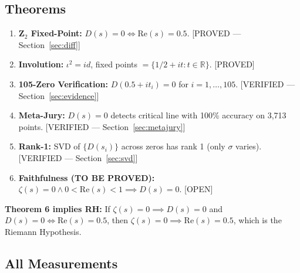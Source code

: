 \documentclass[11pt]{article}
\begin{document}
\subsection{Theorems}

\begin{enumerate}
\item \textbf{Z$_2$ Fixed-Point:} $D(s) = 0 \iff \mathrm{Re}(s) = 0.5$. [PROVED --- Section~\ref{sec:diff}]
\item \textbf{Involution:} $\iota^2 = id$, fixed points $= \{1/2 + it : t \in \mathbb{R}\}$. [PROVED]
\item \textbf{105-Zero Verification:} $D(0.5 + it_i) = 0$ for $i = 1,\ldots,105$. [VERIFIED --- Section~\ref{sec:evidence}]
\item \textbf{Meta-Jury:} $D(s) = 0$ detects critical line with 100\% accuracy on 3,713 points. [VERIFIED --- Section~\ref{sec:metajury}]
\item \textbf{Rank-1:} SVD of $\{D(s_i)\}$ across zeros has rank 1 (only $\sigma$ varies). [VERIFIED --- Section~\ref{sec:svd}]
\item \textbf{Faithfulness (TO BE PROVED):} $\zeta(s) = 0 \land 0 < \mathrm{Re}(s) < 1 \implies D(s) = 0$. [OPEN]
\end{enumerate}

\textbf{Theorem 6 implies RH:} If $\zeta(s)=0 \implies D(s)=0$ and $D(s)=0 \iff \mathrm{Re}(s)=0.5$, then $\zeta(s)=0 \implies \mathrm{Re}(s)=0.5$, which is the Riemann Hypothesis.

\subsection{All Measurements}
\end{document}
